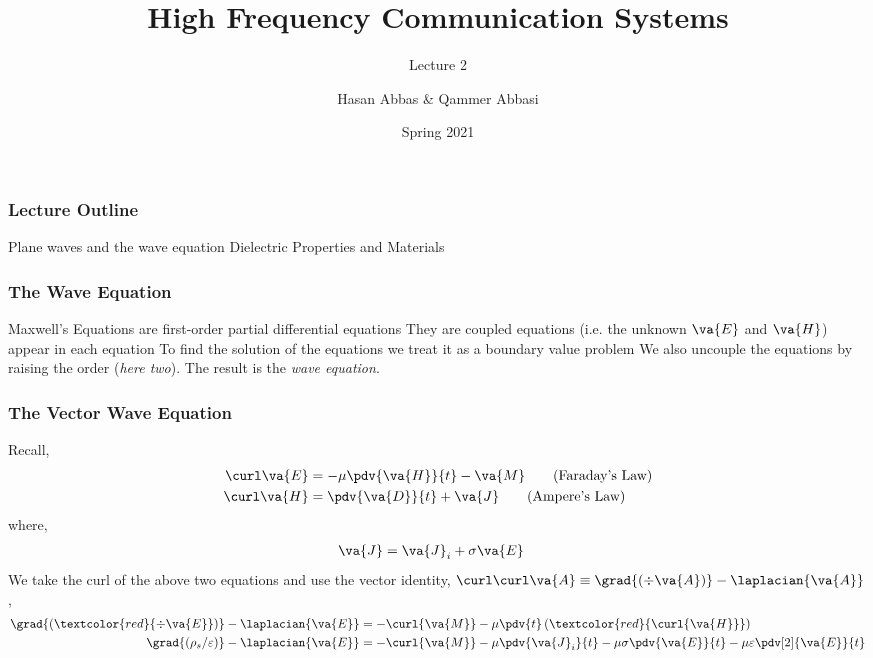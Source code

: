 \documentclass[10pt, compress]{beamer}
\title{High Frequency Communication Systems}
\subtitle{Lecture 2}
\date{Spring 2021}
\author{Hasan Abbas \& Qammer Abbasi}
\newcommand{\E}{\varepsilon}  %
\renewcommand{\u}{\mu}  %
\newcommand{\p}{\rho}  %
\begin{document}
\maketitle

\begin{frame}[fragile]
  \frametitle{Lecture Outline}
\begin{outline}[itemize]
  \1 Plane waves and the wave equation
  \1 Dielectric Properties and Materials
  \1 \color{red}{Nanoscale Electromagnetics}
\end{outline}
\end{frame}
\begin{frame}[fragile]
\frametitle{The Wave Equation}
\begin{outline}
  \1 Maxwell's Equations are first-order partial differential equations
    \2 They are coupled equations (i.e. the unknown $\va{E}$ and $\va{H}$) appear in each equation
  \1 To find the solution of the equations we treat it as a boundary value problem
  \1 We also uncouple the equations by raising the order (\textit{here two}).
  \1 The result is the \textit{wave equation}.
\end{outline}
\end{frame}



\begin{frame}[fragile]
  \frametitle{The Vector Wave Equation}
Recall,
\begin{align*}
  \curl \va{E} &= -\u \pdv{\va{H}}{t} - \va{M} \tag{Faraday's Law}\\
\curl \va{H} &= \pdv{\va{D}}{t} + \va{J} \tag{Ampere's Law} \\
\end{align*}
where,
\begin{align*}
  \va{J} &= \va{J}_i + \sigma \va{E}
\end{align*}
We take the curl of the above two equations and use the vector identity, $\curl \curl \va{A} \equiv \grad{(\div \va{A})} - \laplacian{\va{A}}$,
\begin{align*}
  \grad{(\textcolor{red}{\div \va{E}})}   - \laplacian{\va{E}} &= - \curl{\va{M}} - \u \pdv{t}
  \left( \textcolor{red}{\curl{\va{H}}}  \right)  \\
  \grad{(\p_s /\E)} - \laplacian{\va{E}} &= -\curl{\va{M}} - \u \pdv{\va{J}_i}{t} - \u \sigma \pdv{\va{E}}{t} - \u \E \pdv[2]{\va{E}}{t}
\end{align*}
\end{frame}
\end{document}
